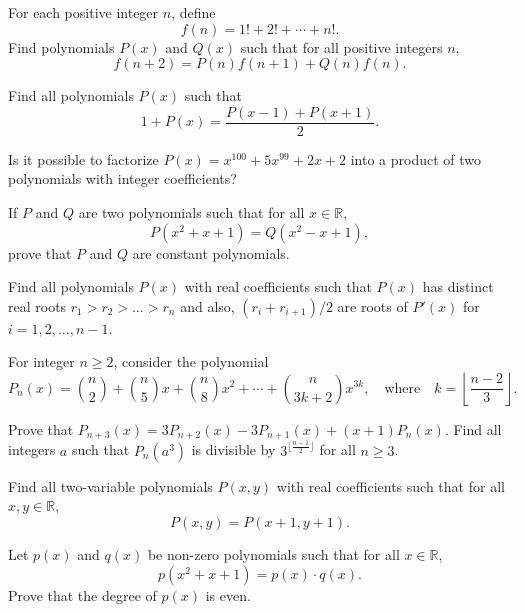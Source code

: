 \documentclass[12pt,a4paper]{memoir}
\theoremstyle{definition}
\begin{document}
\begin{question}
	For each positive integer $n$, define \[f(n) = 1! + 2! + \cdots + n!.\] Find polynomials $P(x)$ and $Q(x)$ such that for all positive integers $n$,
	\[f(n+2) = P(n)f(n+1) + Q(n) f(n).\]
\end{question}


\begin{question}
	Find all polynomials $P(x)$ such that
	\[1+ P(x) = \frac{P(x-1)+P(x+1)}{2}.\]
\end{question}


\begin{question}
	Is it possible to factorize $P(x)=x^{100}+5x^{99}+2x+2$ into a product of two polynomials with integer coefficients?
\end{question}


\begin{question}
	If $P$ and $Q$ are two polynomials such that for all $x\in\mathbb R$, \[P(x^2+x+1)=Q(x^2-x+1),\] prove that $P$ and $Q$ are constant polynomials.
\end{question}

\begin{question}
	Find all polynomials $P(x)$ with real coefficients such that $P(x)$ has distinct real roots $r_1>r_2>\dots > r_n$ and also, $(r_i+r_{i+1})/2$ are roots of $P'(x)$ for $i=1,2,\dots,n-1$.
\end{question}


\begin{question}[name={1997 Bulgaria}]
	For integer $n \geq 2$, consider the polynomial
	\[P_n(x) = \binom {n}{2}+\binom {n}{5}x+\binom {n}{8}x^2 + \cdots + \binom {n}{3k+2}x^{3k}, \quad \text{where} \quad k = \left\lfloor \frac{n-2}{3} \right \rfloor.\]
	\begin{tasks}
		\task Prove that $P_{n+3}(x)=3P_{n+2}(x)-3P_{n+1}(x)+(x+1)P_n(x)$.
		\task Find all integers $a$ such that $P_n(a^3)$ is divisible by $3^{ \lfloor \frac{n-1}{2} \rfloor}$ for all $n \ge 3$.
	\end{tasks}
\end{question}

\begin{question}
	Find all two-variable polynomials $P(x,y)$ with real coefficients such that for all $x,y\in\mathbb R$, \[P(x,y)=P(x+1,y+1).\]
\end{question}

\begin{question}
	Let $p(x)$ and $q(x)$ be non-zero polynomials such that for all $x\in \mathbb R$, \[p(x^2+x+1)=p(x)\cdot q(x).\] Prove that the degree of $p(x)$ is even.
\end{question}
\end{document}
